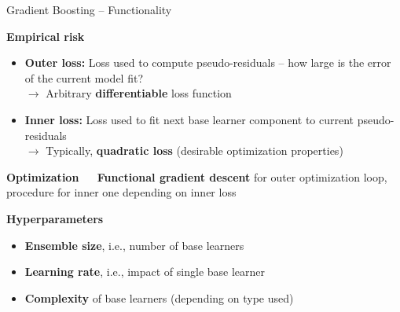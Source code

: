 \documentclass[11pt,compress,t,notes=noshow, xcolor=table]{beamer}
\newcommand{\highlight}[1]{\textcolor{highlightcol}{\textbf{#1}}}
\begin{document}
\begin{frame}{Gradient Boosting -- Functionality}

\footnotesize

\highlight{Empirical risk}

\begin{itemize}
  \item \textbf{Outer loss:} Loss used to compute pseudo-residuals -- how large 
  is the error of the current model fit? \\
  $\rightarrow$ Arbitrary \textbf{differentiable} loss function
  \item \textbf{Inner loss:} Loss used to fit next base learner component to 
  current pseudo-residuals \\
  $\rightarrow$ Typically, \textbf{quadratic loss} (desirable 
  optimization properties)
\end{itemize}

\medskip

\highlight{Optimization} ~~ \textbf{Functional gradient descent} for outer 
optimization loop, procedure for inner one depending on inner loss

\medskip

\highlight{Hyperparameters}

\begin{itemize}
  \item \textbf{Ensemble size}, i.e., number of base learners
  \item \textbf{Learning rate}, i.e., impact of single base learner
  \item \textbf{Complexity} of base learners (depending on type used)
\end{itemize}

\medskip


\end{frame}

\end{document}
